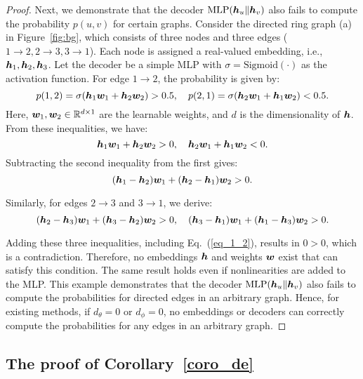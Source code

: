 \begin{proof}
Next, we demonstrate that the decoder $\mathrm{MLP}({\bm{h}}_u \| {\bm{h}}_v)$ also fails to compute the probability $p(u,v)$ for certain graphs. Consider the directed ring graph (a) in Figure~\ref{fig:bg}, which consists of three nodes and three edges ($1 \to 2, 2 \to 3, 3 \to 1$). Each node is assigned a real-valued embedding, i.e., ${\bm{h}}_1, {\bm{h}}_2, {\bm{h}}_3$. Let the decoder be a simple MLP with $\sigma = \mathrm{Sigmoid}(\cdot)$ as the activation function. For edge $1 \to 2$, the probability is given by:
\begin{equation}
    p(1,2) = \sigma({\bm{h}}_1{\bm{w}}_1 + {\bm{h}}_2{\bm{w}}_2) > 0.5, \quad p(2,1) = \sigma({\bm{h}}_2{\bm{w}}_1 + {\bm{h}}_1{\bm{w}}_2) < 0.5.
\end{equation}
Here, ${\bm{w}}_1, {\bm{w}}_2 \in \mathbb{R}^{d \times 1}$ are the learnable weights, and $d$ is the dimensionality of ${\bm{h}}$. From these inequalities, we have:
\begin{equation}
    {\bm{h}}_1{\bm{w}}_1 + {\bm{h}}_2{\bm{w}}_2 > 0, \quad {\bm{h}}_2{\bm{w}}_1 + {\bm{h}}_1{\bm{w}}_2 < 0.
\end{equation}
Subtracting the second inequality from the first gives:
\begin{equation}\label{eq_1_2}
    ({\bm{h}}_1 - {\bm{h}}_2){\bm{w}}_1 + ({\bm{h}}_2 - {\bm{h}}_1){\bm{w}}_2 > 0.
\end{equation}

Similarly, for edges $2 \to 3$ and $3 \to 1$, we derive:
\begin{equation}
    ({\bm{h}}_2 - {\bm{h}}_3){\bm{w}}_1 + ({\bm{h}}_3 - {\bm{h}}_2){\bm{w}}_2 > 0, \quad ({\bm{h}}_3 - {\bm{h}}_1){\bm{w}}_1 + ({\bm{h}}_1 - {\bm{h}}_3){\bm{w}}_2 > 0.
\end{equation}

Adding these three inequalities, including Eq.~(\ref{eq_1_2}), results in $0 > 0$, which is a contradiction. Therefore, no embeddings ${\bm{h}}$ and weights ${\bm{w}}$ exist that can satisfy this condition. The same result holds even if nonlinearities are added to the MLP. This example demonstrates that the decoder $\mathrm{MLP}({\bm{h}}_u \| {\bm{h}}_v)$ also fails to compute the probabilities for directed edges in an arbitrary graph. Hence, for existing methods, if $d_{\theta} = 0$ or $d_{\phi} = 0$, no embeddings or decoders can correctly compute the probabilities for any edges in an arbitrary graph.

\end{proof}

\hypertarget{app_proof_cora_de}{}
\subsection{The proof of Corollary~\ref{coro_de}} \label{app_proof_cora_de}


